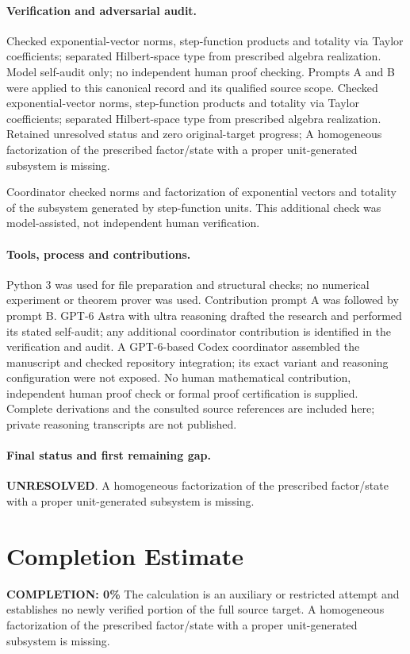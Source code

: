 \documentclass[11pt]{article}
\begin{document}
\paragraph{Verification and adversarial audit.}
Checked exponential-vector norms, step-function products and totality via Taylor coefficients; separated Hilbert-space type from prescribed algebra realization. Model self-audit only; no independent human proof checking. Prompts A and B were applied to this canonical record and its qualified source scope. Checked exponential-vector norms, step-function products and totality via Taylor coefficients; separated Hilbert-space type from prescribed algebra realization. Retained unresolved status and zero original-target progress; A homogeneous factorization of the prescribed factor/state with a proper unit-generated subsystem is missing.

Coordinator checked norms and factorization of exponential vectors and totality of the subsystem generated by step-function units. This additional check was model-assisted, not independent human verification.

\paragraph{Tools, process and contributions.}
Python 3 was used for file preparation and structural checks; no numerical experiment or theorem prover was used. Contribution prompt A was followed by prompt B. GPT-6 Astra with ultra reasoning drafted the research and performed its stated self-audit; any additional coordinator contribution is identified in the verification and audit. A GPT-6-based Codex coordinator assembled the manuscript and checked repository integration; its exact variant and reasoning configuration were not exposed. No human mathematical contribution, independent human proof check or formal proof certification is supplied. Complete derivations and the consulted source references are included here; private reasoning transcripts are not published.

\paragraph{Final status and first remaining gap.}
\textbf{UNRESOLVED}. A homogeneous factorization of the prescribed factor/state with a proper unit-generated subsystem is missing.

\section{Completion Estimate}
\noindent\textbf{COMPLETION: 0\%}
The calculation is an auxiliary or restricted attempt and establishes no newly verified portion of the full source target. A homogeneous factorization of the prescribed factor/state with a proper unit-generated subsystem is missing.
\end{document}
